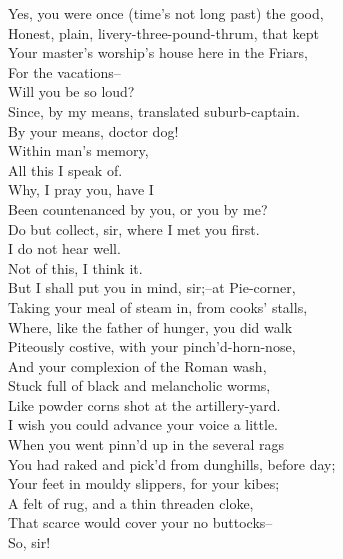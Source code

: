 \documentclass{memoir}
\begin{document}
\begin{drama*}
\subtlespeaks  Yes, you were once (time's not long past) the good,\\
 Honest, plain, livery-three-pound-thrum, that kept\\
 Your master's worship's house here in the Friars,\\
 For the vacations--\\
\facespeaks {} Will you be so loud?\\
\subtlespeaks  Since, by my means, translated suburb-captain.\\
\facespeaks  By your means, doctor dog!\\
\subtlespeaks {} Within man's memory,\\
 All this I speak of.\\
\facespeaks {} Why, I pray you, have I\\
 Been countenanced by you, or you by me?\\
 Do but collect, sir, where I met you first.\\
\subtlespeaks  I do not hear well.\\
\facespeaks {} Not of this, I think it.\\
 But I shall put you in mind, sir;--at Pie-corner,\\
 Taking your meal of steam in, from cooks' stalls,\\
 Where, like the father of hunger, you did walk\\
 Piteously costive, with your pinch'd-horn-nose,\\
 And your complexion of the Roman wash,\\
 Stuck full of black and melancholic worms,\\
 Like powder corns shot at the artillery-yard.\\
\subtlespeaks  I wish you could advance your voice a little.\\
\facespeaks  When you went pinn'd up in the several rags\\
 You had raked and pick'd from dunghills, before day;\\
 Your feet in mouldy slippers, for your kibes;\\
 A felt of rug, and a thin threaden cloke,\\
 That scarce would cover your no buttocks--\\
\subtlespeaks {} So, sir!\\

\end{drama*}
\end{document}
